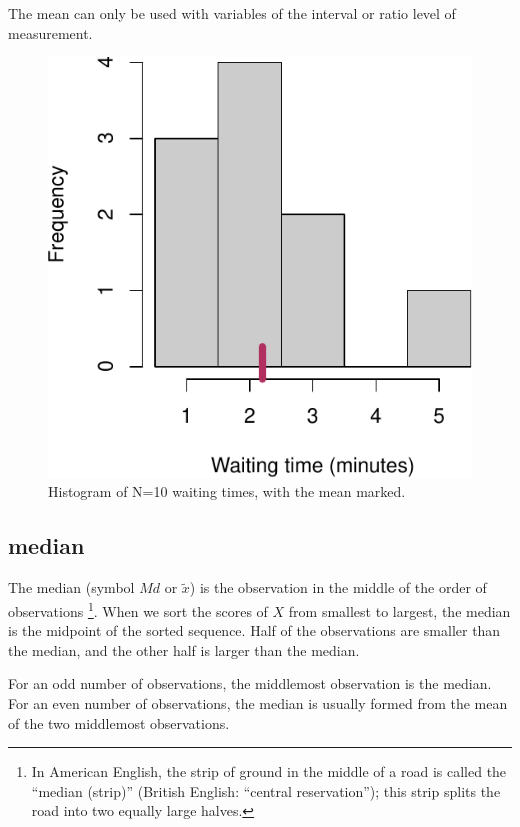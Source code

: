\documentclass[
]{book}
\begin{document}
The mean can only be used with variables of the interval or ratio
level of measurement.

\begin{figure}
\centering
\includegraphics{QMS-EN_files/figure-latex/waittime-hist-1.pdf}
\caption{\label{fig:waittime-hist}Histogram of N=10 waiting times, with the mean marked.}
\end{figure}

\hypertarget{sec:median}{%
\subsection{median}\label{sec:median}}

The median (symbol \(Md\) or \(\tilde{x}\)) is the observation in the middle
of the order of observations \footnote{In American English, the strip of ground in the middle of a road is called the
  ``median (strip)'' (British English: ``central reservation''); this strip splits the road into
  two equally large halves.}. When we sort the scores of \(X\)
from smallest to largest, the median is the midpoint of the sorted
sequence. Half of the observations are smaller than the median,
and the other half is larger than the median.

For an odd number of observations, the middlemost observation is the median.
For an even number of observations, the median is usually formed from
the mean of the two middlemost observations.
\end{document}
